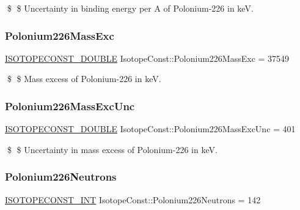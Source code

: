 \$ \$ Uncertainty in binding energy per A of Polonium-\/226 in keV. \mbox{\label{group___isotope_const-_polonium-_po226_ga3a2f10a68221071f5c2cf2ff9c5e3647}} 
\subsubsection{\texorpdfstring{Polonium226\+Mass\+Exc}{Polonium226MassExc}}
{\footnotesize\ttfamily \mbox{\hyperlink{group___isotope_const-_macros_ga8f45a7272ce02c0b4c65c44636ed719a}{I\+S\+O\+T\+O\+P\+E\+C\+O\+N\+S\+T\+\_\+\+D\+O\+U\+B\+LE}} Isotope\+Const\+::\+Polonium226\+Mass\+Exc = 37549}

\$ \$ Mass excess of Polonium-\/226 in keV. \mbox{\label{group___isotope_const-_polonium-_po226_gadc31b4ad83c338d4b0492d86a63222a0}} 
\subsubsection{\texorpdfstring{Polonium226\+Mass\+Exc\+Unc}{Polonium226MassExcUnc}}
{\footnotesize\ttfamily \mbox{\hyperlink{group___isotope_const-_macros_ga8f45a7272ce02c0b4c65c44636ed719a}{I\+S\+O\+T\+O\+P\+E\+C\+O\+N\+S\+T\+\_\+\+D\+O\+U\+B\+LE}} Isotope\+Const\+::\+Polonium226\+Mass\+Exc\+Unc = 401}

\$ \$ Uncertainty in mass excess of Polonium-\/226 in keV. \mbox{\label{group___isotope_const-_polonium-_po226_ga2aa50c9064f07cb3fbe712a2e50bf4ee}} 
\subsubsection{\texorpdfstring{Polonium226\+Neutrons}{Polonium226Neutrons}}
{\footnotesize\ttfamily \mbox{\hyperlink{group___isotope_const-_macros_ga5f18360b3e99483a35c32d789e62621c}{I\+S\+O\+T\+O\+P\+E\+C\+O\+N\+S\+T\+\_\+\+I\+NT}} Isotope\+Const\+::\+Polonium226\+Neutrons = 142}

